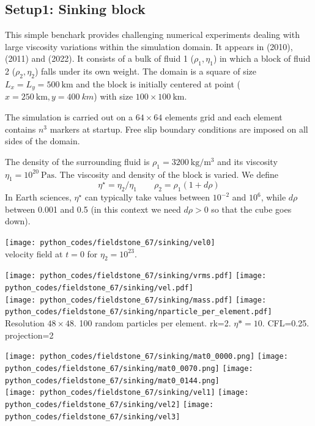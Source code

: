 \subsection*{Setup1: Sinking block} 

This simple benchark provides challenging numerical experiments dealing with large viscosity variations 
within the simulation domain. It appears in \textcite{gery10} (2010), \textcite{thie11} (2011) and
\textcite{thba22} (2022). It consists of a bulk of fluid 1 ($\rho_1,\eta_1$)
in which a block of fluid 2 ($\rho_2,\eta_2$) falls under its own weight.
The domain is a square of size $L_x=L_y=500~\si{\km}$ and the block is initially centered at 
point ($x=250~\si{\km},y=400~\si{km}$) with size $100\times100~\si{\km}$. 

The simulation is carried out on a $64\times64$ elements grid and each element contains $n^3$ markers
at startup. Free slip boundary conditions are imposed on all sides of the domain. 

The density of the surrounding fluid is $\rho_1=3200~\si{\kg\per\cubic\meter}$
and its viscosity $\eta_1=10^{20}~\si{\pascal\second}$.
The viscosity and density of the block is varied. We define
\[
\eta^\star=\eta_2/\eta_1
\quad\quad
\rho_2=\rho_1 (1 + d\rho)
\]
In Earth sciences, $\eta^\star$ can typically take values between $10^{-2}$ and $10^6$,
while $d\rho$ between 0.001 and 0.5 (in this context we need $d\rho>0$ so that the cube 
goes down).

\begin{center}
\texttt{[image: python\_codes/fieldstone\_67/sinking/vel0]}\\
{\captionfont velocity field at $t=0$ for $\eta_2=10^{23}$.}
\end{center}

\begin{center}
\texttt{[image: python\_codes/fieldstone\_67/sinking/vrms.pdf]}
\texttt{[image: python\_codes/fieldstone\_67/sinking/vel.pdf]}\\
\texttt{[image: python\_codes/fieldstone\_67/sinking/mass.pdf]}
\texttt{[image: python\_codes/fieldstone\_67/sinking/nparticle\_per\_element.pdf]}\\
{\captionfont Resolution $48\times48$. 100 random particles per element. rk=2. $\eta*=10$. CFL=0.25. 
projection=2}
\end{center}


\begin{center}
\texttt{[image: python\_codes/fieldstone\_67/sinking/mat0\_0000.png]}
\texttt{[image: python\_codes/fieldstone\_67/sinking/mat0\_0070.png]}
\texttt{[image: python\_codes/fieldstone\_67/sinking/mat0\_0144.png]}\\
\texttt{[image: python\_codes/fieldstone\_67/sinking/vel1]}
\texttt{[image: python\_codes/fieldstone\_67/sinking/vel2]}
\texttt{[image: python\_codes/fieldstone\_67/sinking/vel3]}
\end{center}



